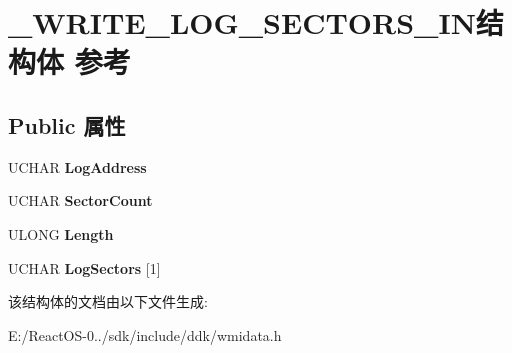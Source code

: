 \hypertarget{struct___w_r_i_t_e___l_o_g___s_e_c_t_o_r_s___i_n}{}\section{\+\_\+\+W\+R\+I\+T\+E\+\_\+\+L\+O\+G\+\_\+\+S\+E\+C\+T\+O\+R\+S\+\_\+\+I\+N结构体 参考}
\label{struct___w_r_i_t_e___l_o_g___s_e_c_t_o_r_s___i_n}
\subsection*{Public 属性}
\begin{DoxyCompactItemize}
\item 
\mbox{\label{struct___w_r_i_t_e___l_o_g___s_e_c_t_o_r_s___i_n_a5b76e00ce53c4af9f50a8a6d2411169b}} 
U\+C\+H\+AR {\bfseries Log\+Address}
\item 
\mbox{\label{struct___w_r_i_t_e___l_o_g___s_e_c_t_o_r_s___i_n_a1f639f3938577d9619e734b00c52175e}} 
U\+C\+H\+AR {\bfseries Sector\+Count}
\item 
\mbox{\label{struct___w_r_i_t_e___l_o_g___s_e_c_t_o_r_s___i_n_a5b832746bde20401b434de51f3bc21ff}} 
U\+L\+O\+NG {\bfseries Length}
\item 
\mbox{\label{struct___w_r_i_t_e___l_o_g___s_e_c_t_o_r_s___i_n_a45c2e817c6ba104f7d19b5041c192ee8}} 
U\+C\+H\+AR {\bfseries Log\+Sectors} \mbox{[}1\mbox{]}
\end{DoxyCompactItemize}


该结构体的文档由以下文件生成\+:\begin{DoxyCompactItemize}
\item 
E\+:/\+React\+O\+S-\/0../sdk/include/ddk/wmidata.\+h\end{DoxyCompactItemize}

